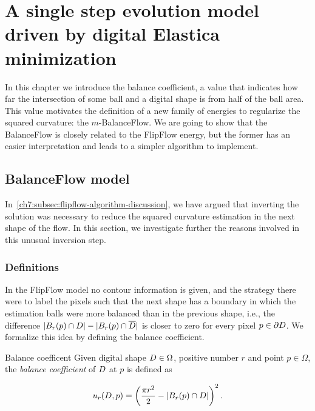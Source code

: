 \chapter{A single step evolution model driven by digital Elastica minimization}
\label{chapter:balance-flow}


In this chapter we introduce the balance coefficient, a value that indicates how far the intersection of some ball and a digital shape is from half of the ball area. This value motivates the definition of a new family of energies to regularize the squared curvature: the $m$-BalanceFlow. We are going to show that the BalanceFlow is closely related to the FlipFlow energy, but the former has an easier interpretation and leads to a simpler algorithm to implement.


\section{BalanceFlow model}
In~\cref{ch7:subsec:flipflow-algorithm-discussion}, we have argued that inverting the solution was necessary to reduce the squared curvature estimation in the next shape of the flow. In this section, we investigate further the reasons involved in this unusual inversion step. 

\subsection{Definitions}

In the FlipFlow model no contour information is given, and the strategy there were to label the pixels such that the next shape has a boundary in which the estimation balls were more balanced than in the previous shape, i.e., the difference $|B_r(p) \cap D| - |B_r(p) \cap \overline{D}|$ is closer to zero for every pixel $p \in \partial D$.  We formalize this idea by defining the balance coefficient.

\begin{definition}{Balance coefficent}
Given digital shape $D \in \Omega$, positive number $r$ and point $p \in \Omega$, the \emph{balance coefficient} of $D$ at $p$ is defined as

\begin{align*}
	u_r(D,p) = \left( \frac{\pi r^2}{2} - |B_r(p) \cap D| \right)^2.
\end{align*}

\end{definition}

